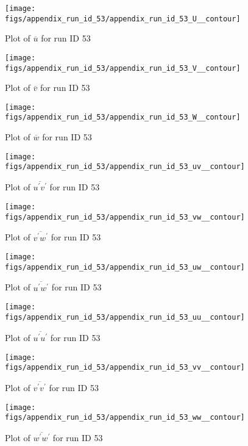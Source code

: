 \begin{figure}[H]
\centering
\texttt{[image: figs/appendix\_run\_id\_53/appendix\_run\_id\_53\_U\_\_contour]}
\caption{Plot of $\overline{u}$ for run ID 53}
\label{fig:appendix_run_id_53_U__contour}
\end{figure}


\begin{figure}[H]
\centering
\texttt{[image: figs/appendix\_run\_id\_53/appendix\_run\_id\_53\_V\_\_contour]}
\caption{Plot of $\overline{v}$ for run ID 53}
\label{fig:appendix_run_id_53_V__contour}
\end{figure}


\begin{figure}[H]
\centering
\texttt{[image: figs/appendix\_run\_id\_53/appendix\_run\_id\_53\_W\_\_contour]}
\caption{Plot of $\overline{w}$ for run ID 53}
\label{fig:appendix_run_id_53_W__contour}
\end{figure}


\begin{figure}[H]
\centering
\texttt{[image: figs/appendix\_run\_id\_53/appendix\_run\_id\_53\_uv\_\_contour]}
\caption{Plot of $\overline{u^\prime v^\prime}$ for run ID 53}
\label{fig:appendix_run_id_53_uv__contour}
\end{figure}


\begin{figure}[H]
\centering
\texttt{[image: figs/appendix\_run\_id\_53/appendix\_run\_id\_53\_vw\_\_contour]}
\caption{Plot of $\overline{v^\prime w^\prime}$ for run ID 53}
\label{fig:appendix_run_id_53_vw__contour}
\end{figure}


\begin{figure}[H]
\centering
\texttt{[image: figs/appendix\_run\_id\_53/appendix\_run\_id\_53\_uw\_\_contour]}
\caption{Plot of $\overline{u^\prime w^\prime}$ for run ID 53}
\label{fig:appendix_run_id_53_uw__contour}
\end{figure}


\begin{figure}[H]
\centering
\texttt{[image: figs/appendix\_run\_id\_53/appendix\_run\_id\_53\_uu\_\_contour]}
\caption{Plot of $\overline{u^\prime u^\prime}$ for run ID 53}
\label{fig:appendix_run_id_53_uu__contour}
\end{figure}


\begin{figure}[H]
\centering
\texttt{[image: figs/appendix\_run\_id\_53/appendix\_run\_id\_53\_vv\_\_contour]}
\caption{Plot of $\overline{v^\prime v^\prime}$ for run ID 53}
\label{fig:appendix_run_id_53_vv__contour}
\end{figure}


\begin{figure}[H]
\centering
\texttt{[image: figs/appendix\_run\_id\_53/appendix\_run\_id\_53\_ww\_\_contour]}
\caption{Plot of $\overline{w^\prime w^\prime}$ for run ID 53}
\label{fig:appendix_run_id_53_ww__contour}
\end{figure}


